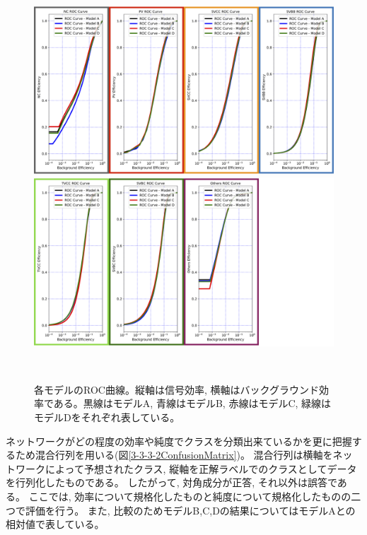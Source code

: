 \begin{figure}[htbp]
 \centering
  \begin{minipage}{1.0\textwidth}
   \centering
    \includegraphics[width=1.0\textwidth, clip]{Figure/3Networks/3-3-3-2ROC_Curve_1.png}
   \end{minipage}
   
   \begin{minipage}{1.0\textwidth}
   \centering
    \includegraphics[width=1.0\textwidth, clip]{Figure/3Networks/3-3-3-2ROC_Curve_2.png}
   \end{minipage}
  \caption[各モデルのROC曲線]{各モデルのROC曲線。縦軸は信号効率, 横軸はバックグラウンド効率である。黒線はモデルA, 青線はモデルB, 赤線はモデルC, 緑線はモデルDをそれぞれ表している。}
  \label{3-3-3-2ROC_Curve}
\end{figure}

ネットワークがどの程度の効率や純度でクラスを分類出来ているかを更に把握するため混合行列を用いる(図\ref{3-3-3-2ConfusionMatrix})。
混合行列は横軸をネットワークによって予想されたクラス, 縦軸を正解ラベルでのクラスとしてデータを行列化したものである。
したがって, 対角成分が正答, それ以外は誤答である。
ここでは, 効率について規格化したものと純度について規格化したものの二つで評価を行う。
また, 比較のためモデルB,C,Dの結果についてはモデルAとの相対値で表している。


